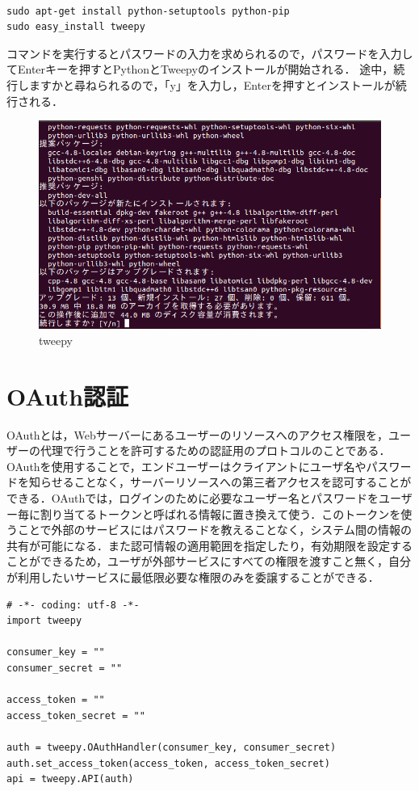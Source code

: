 \begin{verbatim}

sudo apt-get install python-setuptools python-pip
sudo easy_install tweepy

\end{verbatim}

コマンドを実行するとパスワードの入力を求められるので，パスワードを入力してEnterキーを押すとPythonとTweepyのインストールが開始される．
途中，続行しますかと尋ねられるので，「y」を入力し，Enterを押すとインストールが続行される．
\begin{figure}[htb]
\centering
\includegraphics[width=15cm]{tweepy.png}
\caption{tweepy}\label{tweepy}
\end{figure}
\clearpage

\section{OAuth認証}
OAuthとは，Webサーバーにあるユーザーのリソースへのアクセス権限を，ユーザーの代理で行うことを許可するための認証用のプロトコルのことである．
OAuthを使用することで，エンドユーザーはクライアントにユーザ名やパスワードを知らせることなく，サーバーリソースへの第三者アクセスを認可することができる．OAuthでは，ログインのために必要なユーザー名とパスワードをユーザー毎に割り当てるトークンと呼ばれる情報に置き換えて使う．このトークンを使うことで外部のサービスにはパスワードを教えることなく，システム間の情報の共有が可能になる\cite{d}．また認可情報の適用範囲を指定したり，有効期限を設定することができるため，ユーザが外部サービスにすべての権限を渡すこと無く，自分が利用したいサービスに最低限必要な権限のみを委譲することができる．
\begin{verbatim}
# -*- coding: utf-8 -*-
import tweepy

consumer_key = ""
consumer_secret = ""

access_token = ""
access_token_secret = ""

auth = tweepy.OAuthHandler(consumer_key, consumer_secret)
auth.set_access_token(access_token, access_token_secret)
api = tweepy.API(auth)
\end{verbatim}

